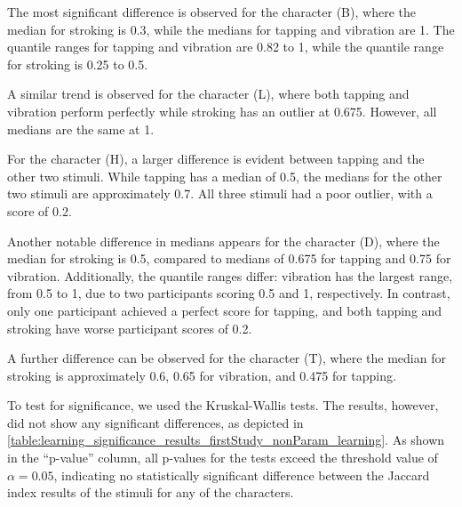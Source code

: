 The most significant difference is observed for the character (B), where the median for stroking is 0.3, while the medians for tapping and vibration are 1. The quantile ranges for tapping and vibration are 0.82 to 1, while the quantile range for stroking is 0.25 to 0.5.

A similar trend is observed for the character (L), where both tapping and vibration perform perfectly while stroking has an outlier at 0.675. However, all medians are the same at 1.

For the character (H), a larger difference is evident between tapping and the other two stimuli. While tapping has a median of 0.5, the medians for the other two stimuli are approximately 0.7. All three stimuli had a poor outlier, with a score of 0.2.

Another notable difference in medians appears for the character (D), where the median for stroking is 0.5, compared to medians of 0.675 for tapping and 0.75 for vibration. Additionally, the quantile ranges differ: vibration has the largest range, from 0.5 to 1, due to two participants scoring 0.5 and 1, respectively. In contrast, only one participant achieved a perfect score for tapping, and both tapping and stroking have worse participant scores of 0.2.

A further difference can be observed for the character (T), where the median for stroking is approximately 0.6, 0.65 for vibration, and 0.475 for tapping.

To test for significance, we used the Kruskal-Wallis tests. The results, however, did not show any significant differences, as depicted in \autoref{table:learning_significance_results_firstStudy_nonParam_learning}. 
As shown in the \enquote{p-value} column, all p-values for the tests exceed the threshold value of $\alpha = 0.05$, indicating no statistically significant difference between the Jaccard index results of the stimuli for any of the characters.


